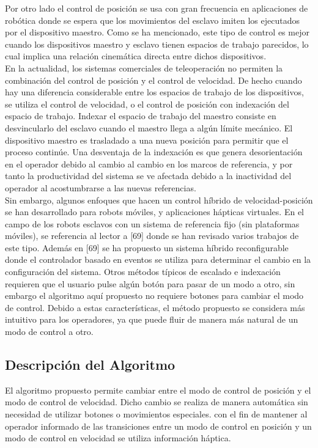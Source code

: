 Por otro lado el control de posición se usa con gran frecuencia en aplicaciones de robótica donde se espera que los movimientos del esclavo imiten los ejecutados por el dispositivo maestro. Como se ha mencionado, este tipo de control es mejor cuando los dispositivos maestro y esclavo tienen espacios de trabajo parecidos, lo cual implica una relación cinemática directa entre dichos dispositivos.\\

En la actualidad, los sistemas comerciales de teleoperación no permiten la combinación del control de posición y el control de velocidad. De hecho cuando hay una diferencia considerable entre los espacios de trabajo de los dispositivos, se utiliza el control de velocidad, o el control de posición con indexación del espacio de trabajo. Indexar el espacio de trabajo del maestro consiste en desvincularlo del esclavo cuando el maestro llega a algún límite mecánico. El dispositivo maestro es trasladado a una nueva posición para permitir que el proceso continúe. Una desventaja de la indexación es que genera desorientación en el operador debido al cambio al cambio en los marcos de referencia, y por tanto la productividad del sistema se ve afectada debido a la inactividad del operador al acostumbrarse a las nuevas referencias.\\

Sin embargo, algunos enfoques que hacen un control híbrido de velocidad-posición se han desarrollado para robots móviles, y aplicaciones hápticas virtuales. En el campo de los robots esclavos con un sistema de referencia fijo (sin plataformas móviles), se referencia al lector a [69] donde se han revisado varios trabajos de este tipo. Además en [69] se ha propuesto un sistema híbrido reconfigurable donde el controlador basado en eventos se utiliza para determinar el cambio en la configuración del sistema. Otros métodos típicos de escalado e indexación requieren que el usuario pulse algún botón para pasar de un modo a otro, sin embargo el algoritmo aquí propuesto no requiere botones para cambiar el modo de control. Debido a estas características, el método propuesto se considera más intuitivo para los operadores, ya que puede fluir de manera más natural de un modo de control a otro.

\subsection*{Descripción del Algoritmo}
El algoritmo propuesto permite cambiar entre el modo de control de posición y el modo de control de velocidad. Dicho cambio se realiza de manera automática sin necesidad de utilizar botones o movimientos especiales. con el fin de mantener al operador informado de las transiciones entre un modo de control en posición y un modo de control en velocidad se utiliza información háptica.

